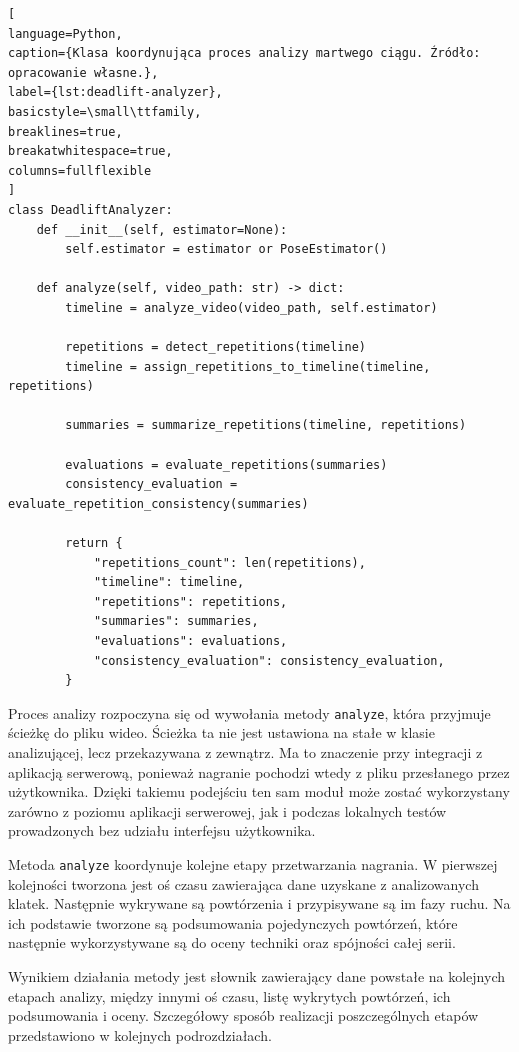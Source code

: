 \begin{lstlisting}[
language=Python,
caption={Klasa koordynująca proces analizy martwego ciągu. Źródło: opracowanie własne.},
label={lst:deadlift-analyzer},
basicstyle=\small\ttfamily,
breaklines=true,
breakatwhitespace=true,
columns=fullflexible
]
class DeadliftAnalyzer:
    def __init__(self, estimator=None):
        self.estimator = estimator or PoseEstimator()

    def analyze(self, video_path: str) -> dict:
        timeline = analyze_video(video_path, self.estimator)

        repetitions = detect_repetitions(timeline)
        timeline = assign_repetitions_to_timeline(timeline, repetitions)

        summaries = summarize_repetitions(timeline, repetitions)

        evaluations = evaluate_repetitions(summaries)
        consistency_evaluation = evaluate_repetition_consistency(summaries)

        return {
            "repetitions_count": len(repetitions),
            "timeline": timeline,
            "repetitions": repetitions,
            "summaries": summaries,
            "evaluations": evaluations,
            "consistency_evaluation": consistency_evaluation,
        }
\end{lstlisting}

Proces analizy rozpoczyna się od wywołania metody \texttt{analyze}, która przyjmuje ścieżkę do pliku wideo. Ścieżka ta nie jest ustawiona na stałe w klasie analizującej, lecz przekazywana z zewnątrz. Ma to znaczenie przy integracji z aplikacją serwerową, ponieważ nagranie pochodzi wtedy z pliku przesłanego przez użytkownika. Dzięki takiemu podejściu ten sam moduł może zostać wykorzystany zarówno z poziomu aplikacji serwerowej, jak i podczas lokalnych testów prowadzonych bez udziału interfejsu użytkownika.

Metoda \texttt{analyze} koordynuje kolejne etapy przetwarzania nagrania. W pierwszej kolejności tworzona jest oś czasu zawierająca dane uzyskane z analizowanych klatek. Następnie wykrywane są powtórzenia i przypisywane są im fazy ruchu. Na ich podstawie tworzone są podsumowania pojedynczych powtórzeń, które następnie wykorzystywane są do oceny techniki oraz spójności całej serii.

Wynikiem działania metody jest słownik zawierający dane powstałe na kolejnych etapach analizy, między innymi oś czasu, listę wykrytych powtórzeń, ich podsumowania i oceny. Szczegółowy sposób realizacji poszczególnych etapów przedstawiono w kolejnych podrozdziałach.

